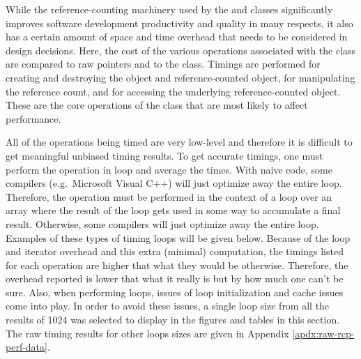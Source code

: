 \documentclass[pdf,ps2pdf,11pt]{SANDreport}
\begin{document}
While the reference-counting machinery used by the {} and
{} classes significantly improves software
development productivity and quality in many respects, it also has a
certain amount of space and time overhead that needs to be considered
in design decisions.  Here, the cost of the various operations
associated with the {} class are compared to raw pointers
and to the {} class.  Timings are performed
for creating and destroying the {} object and
reference-counted object, for manipulating the reference count, and
for accessing the underlying reference-counted object.  These are the
core operations of the {} class that are most likely to
affect performance.

All of the operations being timed are very low-level and therefore it
is difficult to get meaningful unbiased timing results.  To get
accurate timings, one must perform the operation in loop and average
the times.  With naive code, some compilers (e.g.\ Microsoft Visual
C++) will just optimize away the entire loop.  Therefore, the
operation must be performed in the context of a loop over an array
where the result of the loop gets used in some way to accumulate a
final result.  Otherwise, some compilers will just optimize away the
entire loop.  Examples of these types of timing loops will be given
below.  Because of the loop and iterator overhead and this extra
(minimal) computation, the timings listed for each operation are
higher that what they would be otherwise.  Therefore, the overhead
reported is lower that what it really is but by how much one can't be
sure.  Also, when performing loops, issues of loop initialization and
cache issues come into play.  In order to avoid these issues, a single
loop size from all the results of 1024 was selected to display in the
figures and tables in this section.  The raw timing results for other
loops sizes are given in Appendix {}\ref{apdx:raw-rcp-perf-data}.
\end{document}
